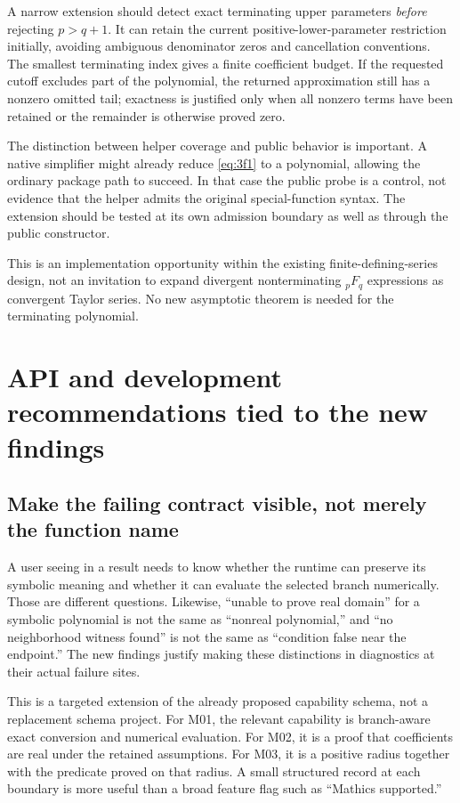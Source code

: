 \documentclass[11pt,a4paper]{article}
\newcommand{\code}[1]{\texttt{\detokenize{#1}}}
\theoremstyle{remark}
\begin{document}
A narrow extension should detect exact terminating upper parameters \emph{before} rejecting $p>q+1$. It can retain the current positive-lower-parameter restriction initially, avoiding ambiguous denominator zeros and cancellation conventions. The smallest terminating index gives a finite coefficient budget. If the requested cutoff excludes part of the polynomial, the returned approximation still has a nonzero omitted tail; exactness is justified only when all nonzero terms have been retained or the remainder is otherwise proved zero.

The distinction between helper coverage and public behavior is important. A native simplifier might already reduce \eqref{eq:3f1} to a polynomial, allowing the ordinary package path to succeed. In that case the public probe is a control, not evidence that the helper admits the original special-function syntax. The extension should be tested at its own admission boundary as well as through the public constructor.

This is an implementation opportunity within the existing finite-defining-series design, not an invitation to expand divergent nonterminating ${}_pF_q$ expressions as convergent Taylor series. No new asymptotic theorem is needed for the terminating polynomial.

\section{API and development recommendations tied to the new findings}
\subsection{Make the failing contract visible, not merely the function name}

A user seeing \code{ProductLog} in a result needs to know whether the runtime can preserve its symbolic meaning and whether it can evaluate the selected branch numerically. Those are different questions. Likewise, ``unable to prove real domain'' for a symbolic polynomial is not the same as ``nonreal polynomial,'' and ``no neighborhood witness found'' is not the same as ``condition false near the endpoint.'' The new findings justify making these distinctions in diagnostics at their actual failure sites.

This is a targeted extension of the already proposed capability schema, not a replacement schema project. For M01, the relevant capability is branch-aware exact conversion and numerical evaluation. For M02, it is a proof that coefficients are real under the retained assumptions. For M03, it is a positive radius together with the predicate proved on that radius. A small structured record at each boundary is more useful than a broad feature flag such as ``Mathics supported.''
\end{document}
